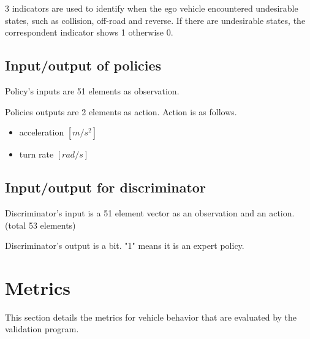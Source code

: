 3 indicators are used to identify when the ego vehicle encountered undesirable states, such as collision, off-road and reverse.
If there are undesirable states, the correspondent  indicator shows 1 otherwise 0.





\subsection{Input/output of policies}

Policy's inputs are 51 elements as observation.

Policies outputs are 2 elements as action.
Action is as follows.

\begin{itemize}
\item acceleration $[m/s^2]$
\item turn rate $[rad/s]$
\end{itemize}


\subsection{Input/output for discriminator}

Discriminator's input is a 51 element vector as an observation and an action. (total 53 elements)

Discriminator's output is a bit. "1" means it is an expert policy.



\section{Metrics}


This section details the metrics for vehicle behavior that are evaluated by the validation program.



